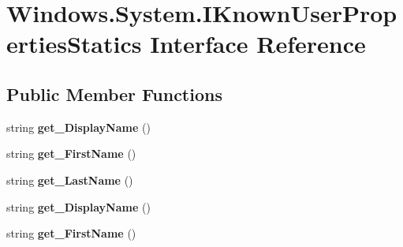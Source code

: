 \hypertarget{interface_windows_1_1_system_1_1_i_known_user_properties_statics}{}\section{Windows.\+System.\+I\+Known\+User\+Properties\+Statics Interface Reference}
\label{interface_windows_1_1_system_1_1_i_known_user_properties_statics}
\subsection*{Public Member Functions}
\begin{DoxyCompactItemize}
\item 
\mbox{\label{interface_windows_1_1_system_1_1_i_known_user_properties_statics_ac8b9cfb2d103bf28e697bd08221113d0}} 
string {\bfseries get\+\_\+\+Display\+Name} ()
\item 
\mbox{\label{interface_windows_1_1_system_1_1_i_known_user_properties_statics_a81b595e47eead1dec9be6ca5de7ff125}} 
string {\bfseries get\+\_\+\+First\+Name} ()
\item 
\mbox{\label{interface_windows_1_1_system_1_1_i_known_user_properties_statics_ac8b7ba9047a6a5661a366c2bd1127682}} 
string {\bfseries get\+\_\+\+Last\+Name} ()
\item 
\mbox{\label{interface_windows_1_1_system_1_1_i_known_user_properties_statics_ac8b9cfb2d103bf28e697bd08221113d0}} 
string {\bfseries get\+\_\+\+Display\+Name} ()
\item 
\mbox{\label{interface_windows_1_1_system_1_1_i_known_user_properties_statics_a81b595e47eead1dec9be6ca5de7ff125}} 
string {\bfseries get\+\_\+\+First\+Name} ()
\item 
\mbox{\label{interface_windows_1_1_system_1_1_i_known_user_properties_statics_ac8b7ba9047a6a5661a366c2bd1127682}} 

\end{DoxyCompactItemize}
